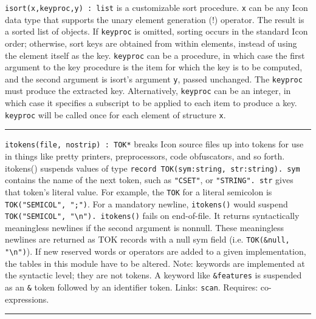 \texttt{i}\texttt{sort}\texttt{(x,keyproc,y) : list} is a
customizable sort procedure. \texttt{x} can be any Icon data type that
supports the unary element generation (!) operator. The result is a
sorted list of objects. If \texttt{keyproc} is omitted, sorting occurs
in the standard Icon order; otherwise, sort keys are obtained from
within elements, instead of using the element itself as the key.
\texttt{keyproc} can be a procedure, in which case the first argument
to the key procedure is the item for which the key is to be computed,
and the second argument is isort's argument
\texttt{y}, passed unchanged. The \texttt{keyproc} must produce the
extracted key. Alternatively, \texttt{keyproc} can be an integer, in
which case it specifies a subscript to be applied to each item to
produce a key. \texttt{keyproc} will be called once for each element of
structure \texttt{x}.

\vspace{0.25cm}\hrule{}

\texttt{itokens(file, nostrip) : TOK*} breaks Icon source files up into
tokens for use in things like pretty printers, preprocessors, code
obfuscators, and so forth. itokens() suspends values of type
\texttt{record TOK(sym:string, str:string). sym} contains the name of
the next token, such as \texttt{"CSET"}, or
\texttt{"STRING". str} gives that
token's literal value. For example, the \texttt{TOK}
for a literal semicolon is
\texttt{TOK("SEMICOL",
";")}. For a mandatory newline,
\texttt{itokens()} would suspend
\texttt{TOK("SEMICOL",
"{\textbackslash}n"). itokens()} fails on
end-of-file. It returns syntactically meaningless newlines if the
second argument is nonnull. These meaningless newlines are returned as
TOK records with a null sym field (i.e. \texttt{TOK(\&null,
"{\textbackslash}n")}). If new reserved
words or operators are added to a given implementation, the tables in
this module have to be altered. Note: keywords are implemented at the
syntactic level; they are not tokens. A keyword like
\texttt{\&features} is suspended as an \texttt{\&} token followed by an
identifier token.
Links: \texttt{scan}. Requires: co-expressions.

\vspace{0.25cm}\hrule{}

